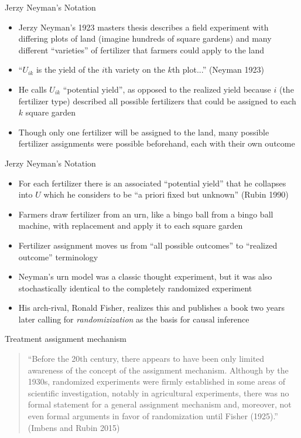 \documentclass{beamer}
\begin{document}
\begin{frame}{Jerzy Neyman's Notation}

\begin{itemize}
\item Jerzy Neyman's 1923 masters thesis describes a field experiment with differing plots of land (imagine hundreds of square gardens) and many different ``varieties'' of fertilizer that farmers could apply to the land
\item ``$U_{ik}$ is the yield of the $i$th variety on the $k$th plot...'' (Neyman 1923)
\item He calls $U_{ik}$ ``potential yield'', as opposed to the realized yield because $i$ (the fertilizer type) described all possible fertilizers that could be assigned to each $k$ square garden
\item Though only one fertilizer will be assigned to the land, many possible fertilizer assignments were possible beforehand, each with their own outcome
\end{itemize}

\end{frame}

\begin{frame}{Jerzy Neyman's Notation}

\begin{itemize}

\item For each fertilizer there is an associated ``potential yield'' that he collapses into $U$ which he considers to be ``a priori fixed but unknown'' (Rubin 1990)
\item Farmers draw fertilizer from an urn, like a bingo ball from a bingo ball machine, with replacement and apply it to each square garden
\item Fertilizer assignment moves us from ``all possible outcomes'' to ``realized outcome'' terminology
\item Neyman's urn model was a classic thought experiment, but it was also stochastically identical to the completely randomized experiment
\item His arch-rival, Ronald Fisher, realizes this and publishes a book two years later calling for \emph{randomizization} as the basis for causal inference
\end{itemize}

\end{frame}

\begin{frame}{Treatment assignment mechanism}

\begin{quote}

``Before the 20th century, there appears to have been only limited awareness of the concept of the assignment mechanism.  Although by the 1930s, randomized experiments were firmly established in some areas of scientific investigation, notably in agricultural experiments, there was no formal statement for a general assignment mechanism and, moreover, not even formal arguments in favor of randomization until Fisher (1925).'' (Imbens and Rubin 2015)

\end{quote}

\end{frame}
\end{document}
